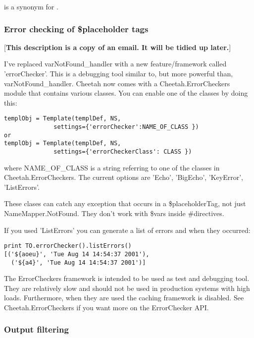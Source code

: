  is a synonym for .

\subsubsection{Error checking of \$placeholder tags}

[{\bf This description is a copy of an email.  It will be tidied up later.}]

I've replaced varNotFound_handler with a new feature/framework called
'errorChecker'.  This is a debugging tool similar to, but more powerful than,
varNotFound_handler.  Cheetah now comes with a Cheetah.ErrorCheckers module that
contains various classes.  You can enable one of the classes by doing this:

\begin{verbatim}
templObj = Template(templDef, NS, 
              settings={'errorChecker':NAME_OF_CLASS })
or 
templObj = Template(templDef, NS, 
              settings={'errorCheckerClass': CLASS })
\end{verbatim}

where NAME_OF_CLASS is a string referring to one of the classes in
Cheetah.ErrorCheckers.  The current options are 'Echo', 'BigEcho', 'KeyError',
'ListErrors'.

These clases can catch any exception that occurs in a \$placeholderTag, not just
NameMapper.NotFound.  They don't work with \$vars inside \#directives.

If you used 'ListErrors' you can generate a list of errors and when they
occurred:

\begin{verbatim}
print TO.errorChecker().listErrors()
[('${aoeu}', 'Tue Aug 14 14:54:37 2001'), 
  ('${a4}', 'Tue Aug 14 14:54:37 2001')]
\end{verbatim}

The ErrorCheckers framework is intended to be used as test and debugging tool.
They are relatively slow and should not be used in production systems with high
loads.  Furthermore, when they are used the caching framework is disabled. See
Cheetah.ErrorCheckers if you want more on the ErrorChecker API.




\subsubsection{Output filtering}

